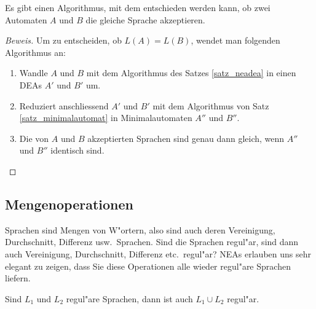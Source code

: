 \begin{satz}
Es gibt einen Algorithmus, mit dem entschieden werden kann, ob
zwei Automaten $A$ und $B$ die gleiche Sprache akzeptieren.
\end{satz}

\begin{proof}[Beweis]
Um zu entscheiden, ob $L(A)=L(B)$, wendet man folgenden Algorithmus
an:
\begin{enumerate}
\item Wandle $A$ und $B$
mit dem Algorithmus des Satzes 
\ref{satz_neadea} in einen DEAs $A'$ und $B'$ um.
\item Reduziert anschliessend $A'$ und $B'$  mit dem Algorithmus
von Satz \ref{satz_minimalautomat} in Minimalautomaten
$A''$ und $B''$.
\item Die von $A$ und $B$ akzeptierten Sprachen sind genau dann
gleich, wenn $A''$ und $B''$ identisch sind.
\end{enumerate}
\end{proof}

\subsection{Mengenoperationen\label{regulaer:mengenoperationen}}
Sprachen sind Mengen von W"ortern, also sind auch deren Vereinigung,
Durchschnitt, Differenz usw.~Sprachen. Sind die Sprachen regul"ar,
sind dann auch Vereinigung, Durchschnitt, Differenz etc.~regul"ar? 
NEAs erlauben uns sehr elegant zu zeigen, dass Sie diese Operationen
alle wieder regul"are Sprachen liefern.

\begin{satz}
\label{satz_union}
Sind $L_1$ und $L_2$ regul"are Sprachen, dann
ist auch $L_1\cup L_2$ regul"ar.
\end{satz}


